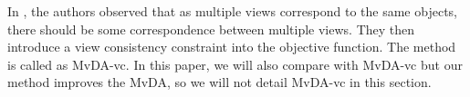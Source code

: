      In \cite{kan2016multi}, the authors observed that as multiple views correspond to the same objects, there should be some correspondence between multiple views. They then introduce a view consistency constraint into the objective function. The method is called as MvDA-vc. In this paper, we will also compare with MvDA-vc but our method improves the MvDA, so we will not detail MvDA-vc in this section. 
     
     
     
